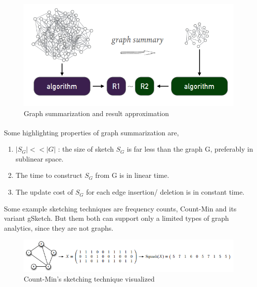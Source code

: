 \documentclass[12pt]{report}
\numberwithin{figure}{section}
\numberwithin{table}{section}
\begin{document}
\begin{figure}[H]
\centering
\includegraphics[scale=0.6]{images/image02}
\caption{Graph summarization and result approximation}
\end{figure}

\paragraph{}
Some highlighting properties of graph summarization are, 

\begin{enumerate}

\item $ | S_G | << | G |$ : the size of sketch $S_G$ is far less than the graph G, preferably in sublinear space.
\item The time to construct $S_G$ from G is in linear time.
\item The update cost of $S_G$ for each edge insertion/ deletion is in constant time.

\end{enumerate}

Some example sketching techniques are frequency counts\cite{frequency counts}, Count-Min\cite{CountMin} and its variant gSketch\cite{gSketch}. But them both can support only a limited types of graph analytics, since they are not graphs.

\begin{figure}[H]
\centering
\includegraphics[scale=0.6]{images/image15}
\caption{Count-Min's sketching technique visualized}
\end{figure}


\paragraph{}
\end{document}
